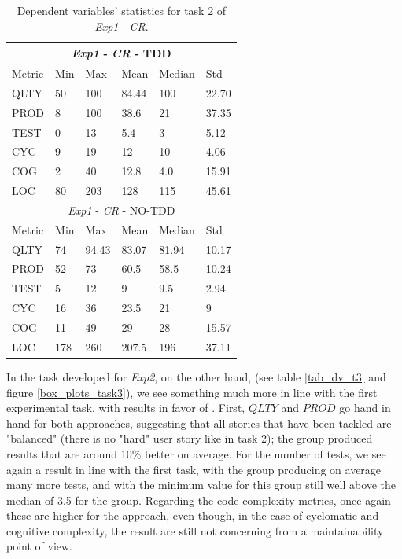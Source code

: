 \begin{table}[H]
    \begin{center} 
        \begin{tabular}{ |p{2cm}||p{1.6cm}|p{1.6cm}|p{1.6cm}|p{1.6cm}|p{1.6cm}|}
            \hline
                \multicolumn{6}{|c|}{\textit{Exp1} - \textit{CR} - TDD} \\
            \hline
                Metric & Min & Max & Mean & Median & Std\\
            \hline
                QLTY & 50 & 100 & 84.44 & 100 & 22.70 \\
                PROD & 8 & 100 & 38.6 & 21 & 37.35 \\
                TEST & 0 & 13 & 5.4 & 3 & 5.12 \\
                CYC & 9 & 19 & 12 & 10 & 4.06 \\
                COG & 2 & 40 & 12.8 & 4.0 & 15.91 \\
                LOC & 80 & 203 & 128 & 115 & 45.61 \\
            \hline\hline
                \multicolumn{6}{|c|}{\textit{Exp1} - \textit{CR} - NO-TDD} \\
            \hline
                Metric & Min & Max & Mean & Median & Std\\
            \hline
                QLTY & 74 & 94.43 & 83.07 & 81.94 & 10.17 \\
                PROD & 52 & 73 & 60.5 & 58.5 & 10.24 \\
                TEST & 5 & 12 & 9 & 9.5 & 2.94 \\
                CYC & 16 & 36 & 23.5 & 21 & 9 \\
                COG & 11 & 49 & 29 & 28 & 15.57 \\
                LOC & 178 & 260 & 207.5 & 196 & 37.11 \\
            \hline
        \end{tabular}
        \caption{\label{tab_dv_t2}Dependent variables' statistics for task 2 of \textit{Exp1} - \textit{CR}.}
    \end{center}
\end{table}

In the task developed for \textit{Exp2}, on the other hand, (see table \ref{tab_dv_t3} and figure \ref{box_plots_task3}), we see something much more in line with the first experimental task, with results in favor of \tdd.
First, $QLTY$ and $PROD$ go hand in hand for both approaches, suggesting that all stories that have been tackled are "balanced" (\ie there is no "hard" user story like in task 2); the \tdd group produced results that are around 10\% better on average.
For the number of tests, we see again a result in line with the first task, with the \tdd group producing on average many more tests, and with the minimum value for this group still well above the median of 3.5 for the \notdd group.
Regarding the code complexity metrics, once again these are higher for the \tdd approach, even though, in the case of cyclomatic and cognitive complexity, the result are still not concerning from a maintainability point of view.

